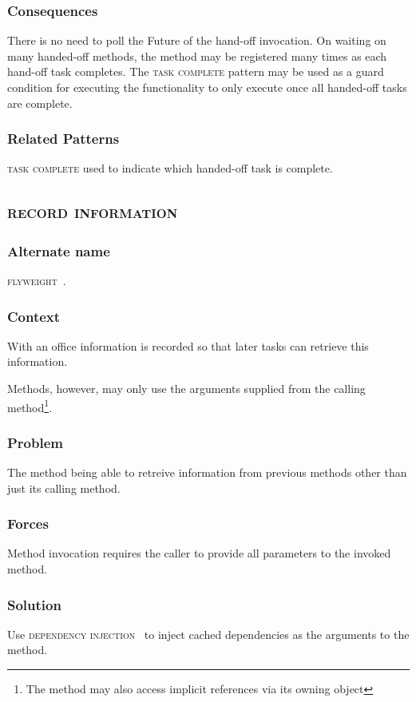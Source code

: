 \documentclass[prodmode]{style/acmlarge}
\begin{document}
\subsubsection*{Consequences} There is no need to poll the Future of the
hand-off invocation.  On waiting on many handed-off methods, the method may be
registered many times as each hand-off task completes.  The \textsc{task
complete} pattern may be used as a guard condition for executing the
functionality to only execute once all handed-off tasks are complete.

\subsubsection*{Related Patterns} \textsc{task complete} used to indicate which
handed-off task is complete.



\subsection{\textsc{\textbf{record information}}}

\subsubsection*{Alternate name} \textsc{flyweight}~\cite{gof}.

\subsubsection*{Context} With an office information is recorded so that later
tasks can retrieve this information.

Methods, however, may only use the arguments supplied from the calling
method\footnote{The method may also access implicit references via its
owning object}.

\subsubsection*{Problem} The method being able to retreive information from
previous methods other than just its calling method.

\subsubsection*{Forces} Method invocation requires the caller to provide all
parameters to the invoked method.

\subsubsection*{Solution} Use \textsc{dependency injection}~\cite{ioc} to inject
cached dependencies as the arguments to the method.
\end{document}

